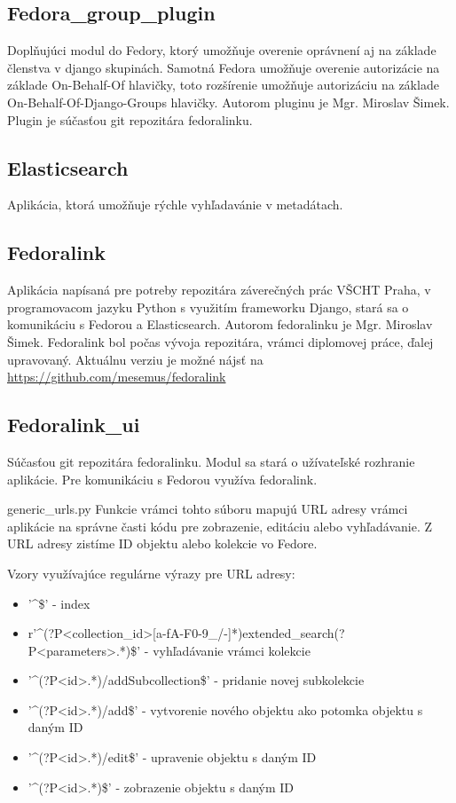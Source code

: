 \documentclass[thesis=M,slovak]{FITthesis}[2013/05/06]
\begin{document}
\subsection{Fedora\_group\_plugin}
Doplňujúci modul do Fedory, ktorý umožňuje overenie oprávnení aj na základe členstva v django skupinách. Samotná Fedora umožňuje overenie autorizácie na základe On-Behalf-Of hlavičky, toto rozšírenie umožňuje autorizáciu na základe On-Behalf-Of-Django-Groups hlavičky. Autorom pluginu je Mgr. Miroslav Šimek. Plugin je súčasťou git repozitára fedoralinku.

\subsection{Elasticsearch}
Aplikácia, ktorá umožňuje rýchle vyhľadavánie v metadátach.

\subsection{Fedoralink}
Aplikácia napísaná pre potreby repozitára záverečných prác VŠCHT Praha, v programovacom jazyku Python s využitím frameworku Django, stará sa o komunikáciu s Fedorou a Elasticsearch. Autorom fedoralinku je Mgr. Miroslav Šimek. Fedoralink bol počas vývoja repozitára, vrámci diplomovej práce, ďalej upravovaný. Aktuálnu verziu je možné nájsť na \url{https://github.com/mesemus/fedoralink}

\subsection{Fedoralink\_ui}
Súčasťou git repozitára fedoralinku. Modul sa stará o užívateľské rozhranie aplikácie. Pre komunikáciu s Fedorou využíva fedoralink.

generic\_urls.py
Funkcie vrámci tohto súboru mapujú URL adresy vrámci aplikácie na správne časti kódu pre zobrazenie, editáciu alebo vyhľadávanie. Z URL adresy zistíme ID objektu alebo kolekcie vo Fedore.

Vzory využívajúce regulárne výrazy pre URL adresy:
\begin{itemize}
	\item '\textasciicircum\$' - index
	\item r'\textasciicircum(?P<collection\_id>[a-fA-F0-9\_/-]*)extended\_search(?P<parameters>.*)\$' - vyhľadávanie vrámci kolekcie
	\item '\textasciicircum(?P<id>.*)/addSubcollection\$' - pridanie novej subkolekcie
	\item '\textasciicircum(?P<id>.*)/add\$' - vytvorenie nového objektu ako potomka objektu s daným ID
	\item '\textasciicircum(?P<id>.*)/edit\$' - upravenie objektu s daným ID
	\item '\textasciicircum(?P<id>.*)\$' - zobrazenie objektu s daným ID
\end{itemize}
\end{document}

